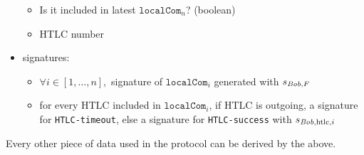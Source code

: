 \begin{itemize}
\begin{itemize}
        \item Is it included in latest $\mathtt{localCom}_n$? (boolean)
        \item HTLC number
      \end{itemize}
    \item signatures:
    \begin{itemize}
      \item $\forall i \in [1, \dots, n],$ signature of $\mathtt{localCom}_i$
      generated with $s_{\mathit{Bob}, F}$
      \item for every HTLC included in $\mathtt{localCom}_i$, if HTLC is
      outgoing, a signature for \texttt{HTLC-timeout}, else a signature for
      \texttt{HTLC-success} with $s_{\mathit{Bob}, \mathrm{htlc}, i}$
    \end{itemize}
  \end{itemize}
  Every other piece of data used in the protocol can be derived by the above.
